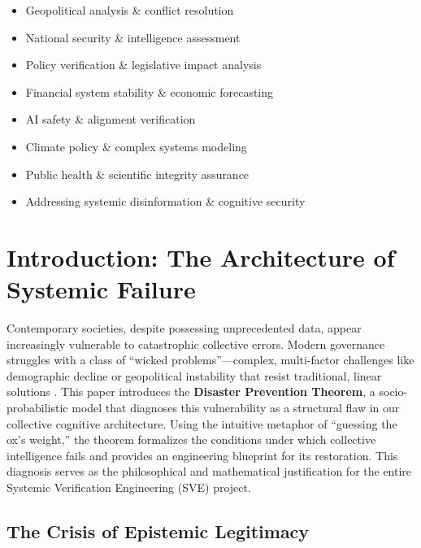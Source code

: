 \documentclass[11pt,a4paper]{article}
\begin{document}
\begin{small}
\begin{center}
\begin{minipage}{0.88\textwidth}
\begin{itemize}[nosep, itemsep=0.2em, topsep=0pt, leftmargin=1.5em]
    \item Geopolitical analysis \& conflict resolution
    \item National security \& intelligence assessment
    \item Policy verification \& legislative impact analysis
    \item Financial system stability \& economic forecasting
    \item AI safety \& alignment verification
    \item Climate policy \& complex systems modeling
    \item Public health \& scientific integrity assurance
    \item Addressing systemic disinformation \& cognitive security
\end{itemize}
\end{minipage}
\end{center}
\end{small}

\clearpage


\section{Introduction: The Architecture of Systemic Failure}

Contemporary societies, despite possessing unprecedented data, appear increasingly vulnerable to catastrophic collective errors. Modern governance struggles with a class of ``wicked problems''---complex, multi-factor challenges like demographic decline or geopolitical instability that resist traditional, linear solutions \citep{Rittel1973}. This paper introduces the \textbf{Disaster Prevention Theorem}, a socio-probabilistic model that diagnoses this vulnerability as a structural flaw in our collective cognitive architecture. Using the intuitive metaphor of ``guessing the ox's weight,'' the theorem formalizes the conditions under which collective intelligence fails and provides an engineering blueprint for its restoration. This diagnosis serves as the philosophical and mathematical justification for the entire Systemic Verification Engineering (SVE) project.

\subsection{The Crisis of Epistemic Legitimacy}
\end{document}
